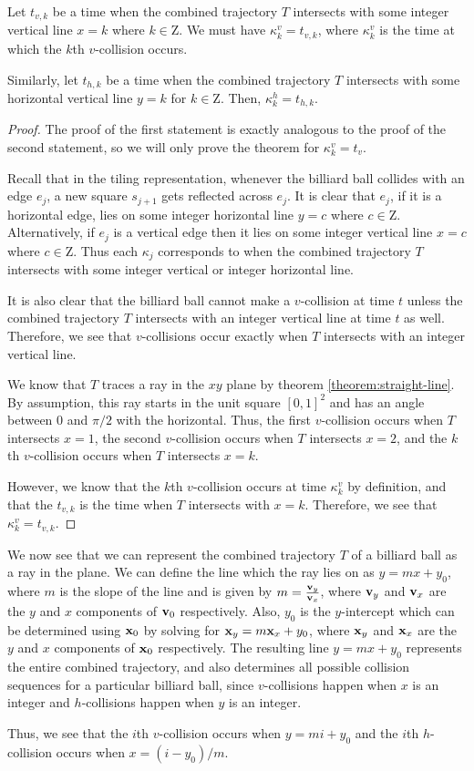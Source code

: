\begin{theorem}
  Let $t_{v, k}$ be a time when the combined trajectory $T$ intersects with some integer vertical line $x = k$ where $k \in \mathrm{Z}$. We must have $\kappa^v_k = t_{v, k}$, where $\kappa^v_k$ is the time at which the $k$th $v$-collision occurs.

  Similarly, let $t_{h, k}$ be a time when the combined trajectory $T$ intersects with some horizontal vertical line $y = k$ for $k \in \mathrm{Z}$. Then, $\kappa^h_k = t_{h, k}$.
\end{theorem}
\begin{proof}
  The proof of the first statement is exactly analogous to the proof of the second statement, so we will only prove the theorem for $\kappa^v_k = t_v$.

  Recall that in the tiling representation, whenever the billiard ball collides with an edge $e_j$, a new square $s_{j+1}$ gets reflected across $e_j$. It is clear that $e_j$, if it is a horizontal edge, lies on some integer horizontal line $y = c$ where $c \in \mathrm{Z}$. Alternatively, if $e_j$ is a vertical edge then it lies on some integer vertical line $x = c$ where $c \in \mathrm{Z}$. Thus each $\kappa_j$ corresponds to when the combined trajectory $T$ intersects with some integer vertical or integer horizontal line.

  It is also clear that the billiard ball cannot make a $v$-collision at time $t$ unless the combined trajectory $T$ intersects with an integer vertical line at time $t$ as well. Therefore, we see that $v$-collisions occur exactly when $T$ intersects with an integer vertical line.

  We know that $T$ traces a ray in the $xy$ plane by theorem \ref{theorem:straight-line}. By assumption, this ray starts in the unit square $[0,1]^2$ and has an angle between $0$ and $\pi/2$ with the horizontal. Thus, the first $v$-collision occurs when $T$ intersects $x = 1$, the second $v$-collision occurs when $T$ intersects $x = 2$, and the $k$th $v$-collision occurs when $T$ intersects $x = k$.

  However, we know that the $k$th $v$-collision occurs at time $\kappa^v_{k}$ by definition, and that the $t_{v, k}$ is the time when $T$ intersects with $x = k$. Therefore, we see that $\kappa^v_{k} = t_{v, k}$.
\end{proof}

We now see that we can represent the combined trajectory $T$ of a billiard ball as a ray in the plane. We can define the line which the ray lies on as $y = mx + y_0$, where $m$ is the slope of the line and is given by $m = \frac{\mathbf{v}_y}{\mathbf{v}_x}$, where $\mathbf{v}_y$ and $\mathbf{v}_x$ are the $y$ and $x$ components of $\mathbf{v}_0$ respectively. Also, $y_0$ is the $y$-intercept which can be determined using $\mathbf{x}_0$ by solving for $\mathbf{x}_y = m \mathbf{x}_x + y_0$, where $\mathbf{x}_y$ and $\mathbf{x}_x$ are the $y$ and $x$ components of $\mathbf{x}_0$ respectively. The resulting line $y = mx + y_0$ represents the entire combined trajectory, and also determines all possible collision sequences for a particular billiard ball, since $v$-collisions happen when $x$ is an integer and $h$-collisions happen when $y$ is an integer.

Thus, we see that the $i$th $v$-collision occurs when $y = mi + y_0$ and the $i$th $h$-collision occurs when $x = (i - y_0) / m$.
